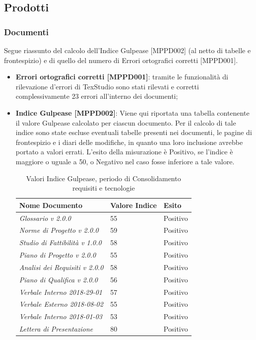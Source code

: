 \documentclass[openany,12pt,a4paper]{report}
\begin{document}
\subsection{Prodotti}

\subsubsection{Documenti}

Segue riassunto del calcolo dell'Indice Gulpease [MPPD002] (al netto di tabelle e frontespizio) e di quello del numero di Errori ortografici corretti [MPPD001].

\begin{itemize}
	\item \textbf{Errori ortografici corretti [MPPD001]}: tramite le funzionalità di rilevazione d'errori di TexStudio sono stati rilevati e corretti complessivamente 23 errori all'interno dei documenti;
	
	\item \textbf{Indice Gulpease [MPPD002]}: Viene qui riportata una tabella contenente il valore Gulpease calcolato per ciascun documento.
	Per il calcolo di tale indice sono state escluse eventuali tabelle presenti nei documenti, le pagine di frontespizio e i diari delle modifiche, in quanto una loro inclusione avrebbe portato a valori errati. L'esito della misurazione è Positivo, se l'indice è maggiore o uguale a 50, o Negativo nel caso fosse inferiore a tale valore.
	
	\begin{table}[h]
		\begin{center}
			\setlength\LTleft{6mm}
			\begin{longtable}{|p{60mm}|p{30mm}|p{25mm}|}
				\hline  
				\textbf{Nome Documento} & \textbf{Valore Indice} & \textbf{Esito} \\ \hline    
				\textit{Glossario v 2.0.0} & 55 & Positivo\\ \hline    
				\textit{Norme di Progetto v 2.0.0} & 59 & Positivo\\ \hline    
				\textit{Studio di Fattibilità v 1.0.0} & 58 & Positivo\\ \hline    
				\textit{Piano di Progetto v 2.0.0} & 55 & Positivo\\ \hline    
				\textit{Analisi dei Requisiti v 2.0.0} & 58 & Positivo\\ \hline    
				\textit{Piano di Qualifica v 2.0.0} & 56 & Positivo\\ \hline    
				\textit{Verbale Interno 2018-29-01} & 57 & Positivo\\ \hline
				\textit{Verbale Esterno 2018-08-02} & 55 & Positivo\\ \hline
				\textit{Verbale Interno 2018-01-03} & 53 & Positivo\\ \hline    
				\textit{Lettera di Presentazione} & 80 & Positivo\\ \hline
			\end{longtable}
		\end{center}
		\caption{Valori Indice Gulpease, periodo di Consolidamento requisiti e tecnologie} 
	\end{table} 
	

\end{itemize}
\end{document}
